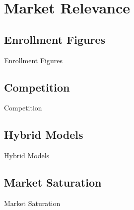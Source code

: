 %
%

\pagebreak
\section{Market Relevance}

\onehalfspacing

\subsection{Enrollment Figures}

Enrollment Figures

\subsection{Competition}

Competition

\subsection{Hybrid Models}

Hybrid Models

\subsection{Market Saturation}

Market Saturation
